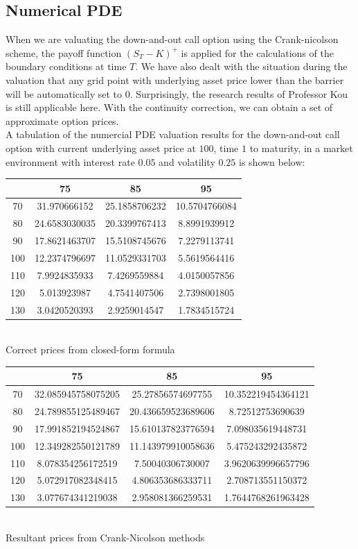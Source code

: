 \subsection{Numerical PDE}
When we are valuating the down-and-out call option using the Crank-nicolson scheme, the payoff function $(S_{T} - K)^{+}$ is applied for the calculations of the boundary conditions at time $T$. We have also dealt with the situation during the valuation that any grid point with underlying asset price lower than the barrier will be automatically set to $0$. Surprisingly, the research results of Professor Kou\cite{ContinuityCorrection} is still applicable here. With the continuity correction, we can obtain a set of approximate option prices.\\[1mm]
A tabulation of the numercial PDE valuation results for the down-and-out call option with current underlying asset price at $100$, time $1$ to maturity, in a market environment with interest rate $0.05$ and volatility $0.25$ is shown below:
\begin{center}
\begin{tabular}{|c|c|c|c|}
\hline 
 & 75 & 85 & 95\\
\hline
70&31.970666152&25.1858706232&10.5704766084\\
80&24.6583030035&20.3399767413&8.8991939912\\
90&17.8621463707&15.5108745676&7.2279113741\\
100&12.2374796697&11.0529331703&5.5619564416\\
110&7.9924835933&7.4269559884&4.0150057856\\
120&5.013923987&4.7541407506&2.7398001805\\
130&3.0420520393&2.9259014547&1.7834515724\\
\hline
\end{tabular}
\\[1mm]Correct prices from closed-form formula
\\[3mm]
\begin{tabular}{|c|c|c|c|}
\hline
 & 75 & 85 & 95\\
\hline
70&32.085945758075205&25.27856574697755&10.352219454364121\\
80&24.789855125489467&20.436659523689606&8.72512753690639\\
90&17.991852194524867&15.610137823776594&7.098035619448731\\
100&12.349282550121789&11.143979910058636&5.475243292435872\\
110&8.078354256172519&7.50040306730007&3.9620639996657796\\
120&5.072917082348415&4.806353686333711&2.708713551150372\\
130&3.077674341219038&2.958081366259531&1.7644768261963428\\
\hline
\end{tabular}
\\[1mm] Resultant prices from Crank-Nicolson methods
\end{center}
